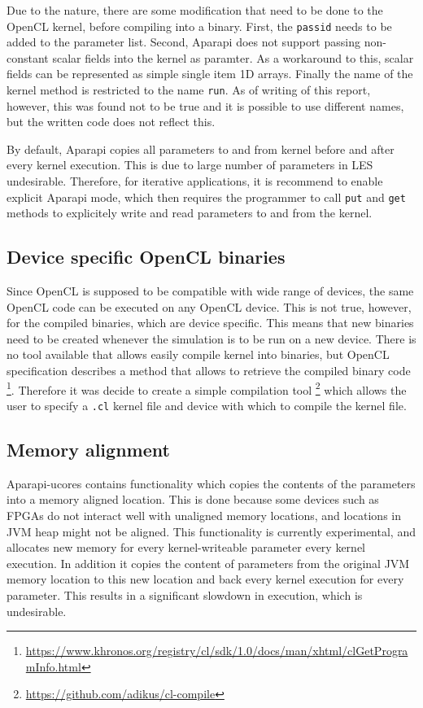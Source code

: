 \documentclass{l4proj}
\begin{document}
Due to the nature, there are some modification that need to be done to the OpenCL
kernel, before compiling into a binary. First, the \texttt{passid} needs to be added to
the parameter list. Second, Aparapi does not support passing non-constant scalar fields
into the kernel as paramter. As a workaround to this, scalar fields can be represented
as simple single item 1D arrays. Finally the name of the kernel method is restricted to
the name \texttt{run}. As of writing of this report, however, this was found not to be true
and it is possible to use different names, but the written code does not reflect this.

By default, Aparapi copies all parameters to and from kernel before and after every kernel
execution. This is due to large number of parameters in LES undesirable. Therefore, for
iterative applications, it is recommend to enable explicit Aparapi mode, which then requires
the programmer to call \texttt{put} and \texttt{get} methods to explicitely write and read 
parameters to and from the kernel.

\subsection{Device specific OpenCL binaries}

Since OpenCL is supposed to be compatible with wide range of devices, the same OpenCL
code can be executed on any OpenCL device. This is not true, however, for the 
compiled binaries, which are device specific. This means that new binaries need to 
be created whenever the simulation is to be run on a new device. There is no
tool available that allows easily compile kernel into binaries, but OpenCL specification
describes a method that allows to retrieve the compiled binary code
\footnote{\url{https://www.khronos.org/registry/cl/sdk/1.0/docs/man/xhtml/clGetProgramInfo.html}}.
Therefore it was decide to create a simple compilation tool 
\footnote{\url{https://github.com/adikus/cl-compile}}
which allows the user to specify a \texttt{.cl} kernel file and device with which to
compile the kernel file.

\subsection{Memory alignment}

Aparapi-ucores contains functionality which copies the contents of the parameters
into a memory aligned location. This is done because some devices such as FPGAs
do not interact well with unaligned memory locations, and locations in JVM heap
might not be aligned. This functionality is currently experimental, and allocates 
new memory for every kernel-writeable parameter every kernel execution. In addition
it copies the content of parameters from the original JVM memory location to this new 
location and back every kernel execution for every parameter. This results in a significant 
slowdown in execution, which is undesirable.
\end{document}
